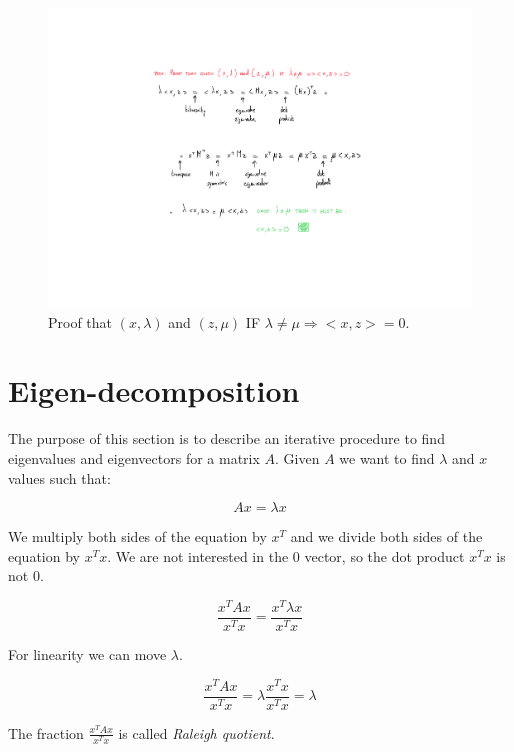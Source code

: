\begin{figure}
    \centering
    \includegraphics[scale=0.5]{images/Dim eigen symm matrix.pdf}
    \caption{Proof that $(x, \lambda)$ and $(z, \mu)$ IF $\lambda \neq \mu \Rightarrow <x,z>=0$.}
    \label{fig:proof_eigen_symmetric}
\end{figure}

\section{Eigen-decomposition}
The purpose of this section is to describe an iterative procedure to find eigenvalues and eigenvectors for a matrix $A$. Given $A$ we want to find $\lambda$ and $x$ values such that:

\begin{equation*}
    Ax=\lambda x
\end{equation*}

We multiply both sides of the equation by $x^T$ and we divide both sides of the equation by $x^T x$. We are not interested in the 0 vector, so the dot product $x^T x$ is not 0.

\begin{equation*}
    \frac{x^T A x}{x^T x} = \frac{x^T \lambda x}{x^T x}
\end{equation*}

For linearity we can move $\lambda$.

\begin{equation*}
    \frac{x^T A x}{x^T x} = \lambda \frac{x^T x}{x^T x} = \lambda
\end{equation*}

The fraction $\frac{x^T A x}{x^T x}$ is called \textit{Raleigh quotient}.

